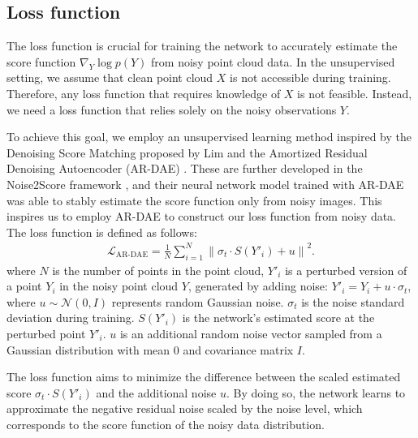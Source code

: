     \subsection{Loss function}
The loss function is crucial for training the network to accurately estimate the score function $\nabla_Y \log p(Y)$ from noisy point cloud data.
In the unsupervised setting, we assume that clean point cloud $X$ is not accessible during training. Therefore, any loss function that requires knowledge of $X$ is not feasible. Instead, we need a loss function that relies solely on the noisy observations $Y$.

To achieve this goal, we employ an unsupervised learning method inspired by the Denoising Score Matching proposed by Lim \cite{vincent2011connection} and the Amortized Residual Denoising Autoencoder (AR-DAE) \cite{lim2020ar-dae}. These are further developed in the Noise2Score framework \cite{noise2score2021}, and their neural network model trained with AR-DAE was able to stably estimate the score function only from noisy images. This inspires us to employ AR-DAE to construct our loss function from noisy data. The loss function is defined as follows:
\begin{eqnarray} 
\mathcal{L}_{\text{AR-DAE}} = \frac{1}{N} \sum_{i=1}^{N} \left\| \sigma_t \cdot S(Y'_i) + u \right\|^2.
\end{eqnarray}
where
$N$ is the number of points in the point cloud,
$Y'_i$ is a perturbed version of a point $Y_i$ in the noisy point cloud $Y$, generated by adding noise: $Y'_i = Y_i + u \cdot \sigma_t$, where $u \sim \mathcal{N}(0, I)$ represents random Gaussian noise.
$\sigma_t$ is the noise standard deviation during training. 
$S(Y'_i)$ is the network's estimated score at the perturbed point $Y'_i$.
$u$ is an additional random noise vector sampled from a Gaussian distribution with mean 0 and covariance matrix $I$.

The loss function aims to minimize the difference between the scaled estimated score $\sigma_t \cdot S(Y'_i)$ and the additional noise $u$. By doing so, the network learns to approximate the negative residual noise scaled by the noise level, which corresponds to the score function of the noisy data distribution.

